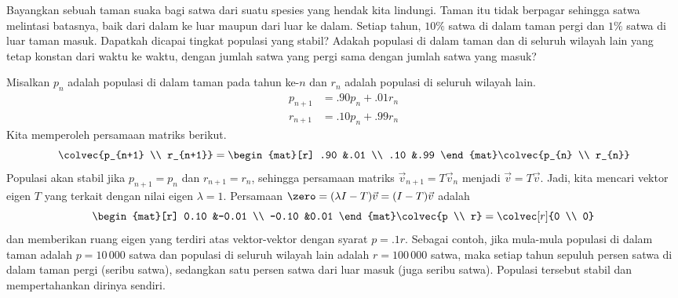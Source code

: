 Bayangkan sebuah taman suaka bagi satwa dari suatu spesies yang hendak kita
lindungi. Taman itu tidak berpagar sehingga satwa melintasi batasnya, baik dari
dalam ke luar maupun dari luar ke dalam. Setiap tahun, $10\%$ satwa di dalam
taman pergi dan $1\%$ satwa di luar taman masuk. Dapatkah dicapai tingkat
populasi yang stabil? Adakah populasi di dalam taman dan di seluruh wilayah
lain yang tetap konstan dari waktu ke waktu, dengan jumlah satwa yang pergi
sama dengan jumlah satwa yang masuk?

Misalkan $p_n$ adalah populasi di dalam taman pada tahun ke-$n$ dan $r_n$
adalah populasi di seluruh wilayah lain.
\begin{align*}
  p_{n+1} 
  &=.90p_n+.01r_n    \\
  r_{n+1}
  &=.10p_n+.99r_n 
\end{align*}
Kita memperoleh persamaan matriks berikut.
\begin{equation*}
  \colvec{p_{n+1} \\ r_{n+1}}
  =\begin{mat}[r]
    .90  &.01  \\
    .10  &.99
  \end{mat}
  \colvec{p_{n} \\ r_{n}}
\end{equation*}
Populasi akan stabil jika $p_{n+1}=p_n$ dan $r_{n+1}=r_n$, sehingga persamaan
matriks $\vec{v}_{n+1}=T\vec{v}_{n}$ menjadi $\vec{v}=T\vec{v}$.
Jadi, kita mencari vektor eigen $T$ yang terkait dengan nilai eigen
$\lambda=1$. Persamaan $\zero=(\lambda I-T)\vec{v}=(I-T)\vec{v}$ adalah
\begin{equation*}
  \begin{mat}[r]
      0.10  &-0.01  \\
      -0.10  &0.01
  \end{mat}
  \colvec{p \\ r}=
  \colvec[r]{0 \\ 0}
\end{equation*}
dan memberikan ruang eigen yang terdiri atas vektor-vektor dengan syarat
$p=.1r$. Sebagai contoh, jika mula-mula populasi di dalam taman adalah
$p=10\,000$ satwa dan populasi di seluruh wilayah lain adalah $r=100\,000$
satwa, maka setiap tahun sepuluh persen satwa di dalam taman pergi (seribu
satwa), sedangkan satu persen satwa dari luar masuk (juga seribu satwa).
Populasi tersebut stabil dan mempertahankan dirinya sendiri.

